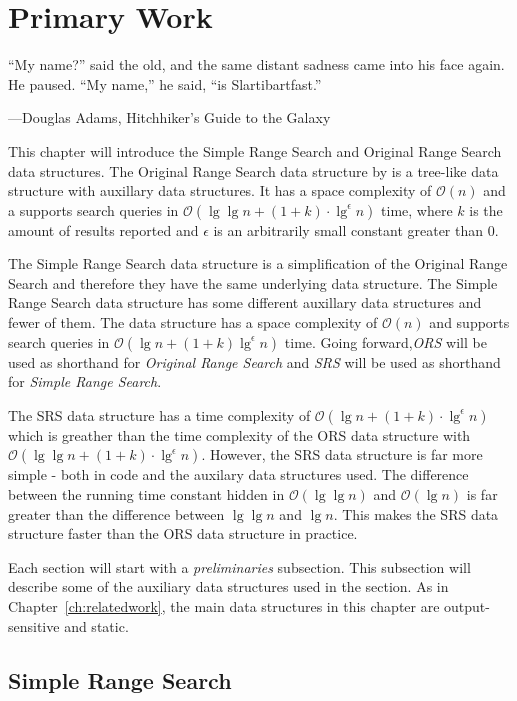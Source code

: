 \chapter{Primary Work}
\label{ch:primarywork}
\epigraph{``My name?'' said the old, and the same distant sadness came into his face again. He paused. ``My name,'' he said, ``is Slartibartfast.''}{---\textup{Douglas Adams}, Hitchhiker's Guide to the Galaxy}


This chapter will introduce the Simple Range Search and Original Range Search data structures. The Original Range Search data structure by \citet{chanetal} is a tree-like data structure with auxillary data structures. It has a space complexity of $\mathcal{O}(n)$ and a supports search queries in $\mathcal{O}(\lg\lg n + (1+k)\cdot\lg^\epsilon n)$ time, where $k$ is the amount of results reported and $\epsilon$ is an arbitrarily small constant greater than $0$.

The Simple Range Search data structure is a simplification of the Original Range Search and therefore they have the same underlying data structure. The Simple Range Search data structure has some different auxillary data structures and fewer of them. The data structure has a space complexity of $\mathcal{O}(n)$ and supports search queries in $\mathcal{O}(\lg n + (1+k)\lg^\epsilon n)$ time. Going forward,\emph{ORS} will be used as shorthand for \emph{Original Range Search} and \emph{SRS} will be used as shorthand for \emph{Simple Range Search}.


The SRS data structure has a time complexity of $\mathcal{O}(\lg n + (1+k)\cdot \lg^\epsilon n)$ which is greather than the time complexity of the ORS data structure with $\mathcal{O}(\lg \lg n + (1+k)\cdot \lg^\epsilon n)$. However, the SRS data structure is far more simple - both in code and the auxilary data structures used. The difference between the running time constant hidden in $\mathcal{O}(\lg \lg n)$ and $\mathcal{O}(\lg n)$ is far greater than the difference between $\lg \lg n$ and $\lg n$. This makes the SRS data structure faster than the ORS data structure in practice.

\vspace{4mm}

Each section will start with a \emph{preliminaries} subsection. This subsection will describe some of the auxiliary data structures used in the section. As in Chapter~\ref{ch:relatedwork}, the main data structures in this chapter are output-sensitive and static.

\section{Simple Range Search}
\label{sect:simple}


